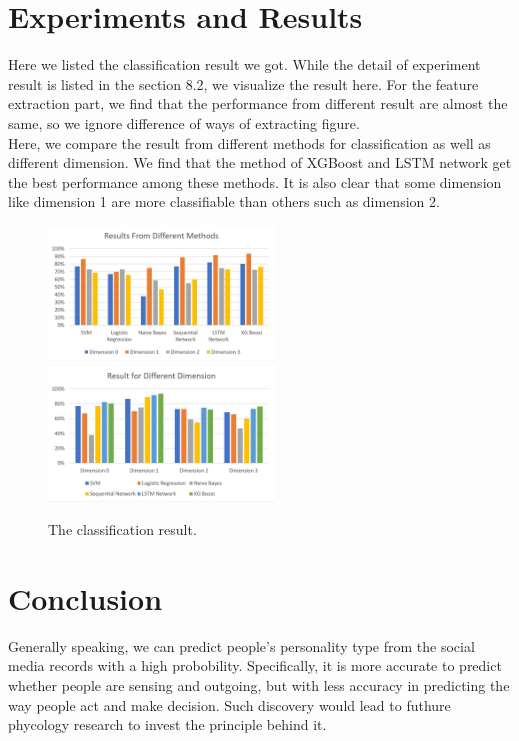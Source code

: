 \documentclass{article}
\begin{document}
\section{Experiments and Results}
Here we listed the classification result we got. While the detail of experiment result is listed in the section 8.2, we visualize the result here.
For the feature extraction part, we find that the performance from different result are almost the same, so we ignore difference of ways of extracting figure. \\
Here, we compare the result from different methods for classification as well as different dimension. We find that the method of XGBoost and LSTM network get the best performance among these methods. It is also clear that some dimension like dimension 1 are more classifiable than others such as dimension 2.
\begin{figure}[h]
	\centering
	\includegraphics[width=6cm]{fig/result1.jpg}
	\includegraphics[width=6cm]{fig/result2.jpg}
	\caption{The classification result.}
	\label{fig:result}
\end{figure}

\section{Conclusion}
Generally speaking, we can predict people's personality type from the social media records with a high probobility. Specifically, it is more accurate to predict whether people are sensing and outgoing, but with less accuracy in predicting the way people act and make decision. Such discovery would lead to futhure phycology research to invest the principle behind it.
\end{document}
